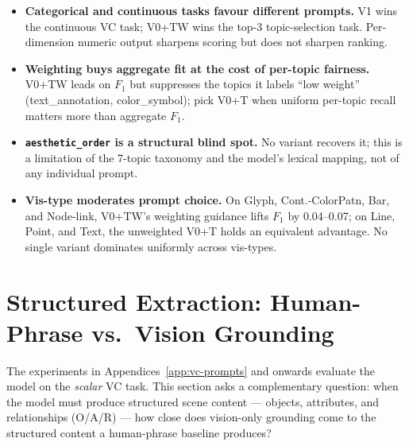 \begin{itemize}
  \item \textbf{Categorical and continuous tasks favour different
    prompts.} V1 wins the continuous VC task; V0+TW wins the
    top-3 topic-selection task. Per-dimension numeric output
    sharpens scoring but does not sharpen ranking.
  \item \textbf{Weighting buys aggregate fit at the cost of
    per-topic fairness.} V0+TW leads on $F_1$ but suppresses the
    topics it labels ``low weight'' (text\_annotation, color\_symbol);
    pick V0+T when uniform per-topic recall matters more than
    aggregate $F_1$.
  \item \textbf{\texttt{aesthetic\_order} is a structural blind
    spot.} No variant recovers it; this is a limitation of the
    7-topic taxonomy and the model's lexical mapping, not of any
    individual prompt.
  \item \textbf{Vis-type moderates prompt choice.} On Glyph,
    Cont.-ColorPatn, Bar, and Node-link, V0+TW's weighting
    guidance lifts $F_1$ by 0.04--0.07; on Line, Point, and Text,
    the unweighted V0+T holds an equivalent advantage. No single
    variant dominates uniformly across vis-types.
\end{itemize}


\section{Structured Extraction: Human-Phrase vs.\ Vision Grounding}
\label{app:oar}

The experiments in Appendices~\ref{app:vc-prompts} and onwards evaluate
the model on the \emph{scalar} VC task. This section asks a
complementary question: when the model must produce structured scene
content --- objects, attributes, and relationships (O/A/R) --- how
close does vision-only grounding come to the structured content a
human-phrase baseline produces?

